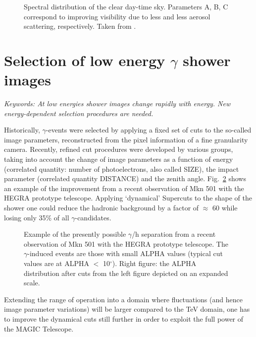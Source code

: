 \begin{figure}[htb]
\epsfxsize=11cm
\caption{Spectral distribution of the clear day-time sky.
Parameters A, B, C correspond to improving visibility 
due to less and less aerosol 
scattering, respectively. Taken from \cite{winter:91}.} 
\label{fig:3.6}
\end{figure}


\section{Selection of low energy $\gamma$ shower images}
\par\medskip
{\it Keywords: At low energies shower images change rapidly with
energy. New energy-dependent selection procedures are needed.}

\par\medskip Historically, $\gamma$-events were selected by applying a
fixed set of cuts to the so-called image 
parameters, reconstructed from the pixel information of a 
fine granularity camera. Recently, 
refined cut procedures were developed by various groups, 
taking into account the change of 
image parameters as a function of energy (correlated quantity:
number of photoelectrons, also 
called SIZE), the impact parameter (correlated quantity 
DISTANCE) and the zenith angle. 
Fig.~\ref{fig:3.7} shows an example of the improvement from a recent
observation of Mkn 501 with the 
HEGRA prototype telescope. Applying `dynamical' Supercuts 
\cite{kranich:97a}
to the shape of the shower one could reduce the hadronic
background  by a factor of  
$\approx$ 60 while losing only 35\% of all $\gamma$-candidates. 

\begin{figure}[htb] \leavevmode \centering
\epsfxsize=13cm
\caption{Example of the presently possible $\gamma$/h separation 
from a recent
observation of Mkn 501 with the
HEGRA prototype telescope. 
The $\gamma$-induced events are those with small ALPHA values (typical
cut values are at ALPHA $<$ 10$^{\circ}$).
Right figure: the ALPHA distribution after cuts
from the left figure depicted on an expanded scale.}
\label{fig:3.7}
\end{figure}

Extending the range of operation into a domain where 
fluctuations (and hence image parameter 
variations) will be larger compared to the TeV domain, 
one has to improve the dynamical cuts still
further in order to exploit the full power of the MAGIC Telescope.

